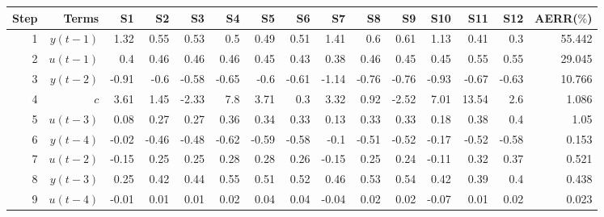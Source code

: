 \begin{tabular}{rrrrrrrrrrrrrrr}
Step & Terms & S1 & S2 & S3 & S4 & S5 & S6 & S7 & S8 & S9 & S10 & S11 & S12 & AERR($\%$) \\ 
\hline 
1 & $y(t-1)$ & 1.32 & 0.55 & 0.53 & 0.5 & 0.49 & 0.51 & 1.41 & 0.6 & 0.61 & 1.13 & 0.41 & 0.3 & 55.442 \\ 
2 & $u(t-1)$ & 0.4 & 0.46 & 0.46 & 0.46 & 0.45 & 0.43 & 0.38 & 0.46 & 0.45 & 0.45 & 0.55 & 0.55 & 29.045 \\ 
3 & $y(t-2)$ & -0.91 & -0.6 & -0.58 & -0.65 & -0.6 & -0.61 & -1.14 & -0.76 & -0.76 & -0.93 & -0.67 & -0.63 & 10.766 \\ 
4 & $c$ & 3.61 & 1.45 & -2.33 & 7.8 & 3.71 & 0.3 & 3.32 & 0.92 & -2.52 & 7.01 & 13.54 & 2.6 & 1.086 \\ 
5 & $u(t-3)$ & 0.08 & 0.27 & 0.27 & 0.36 & 0.34 & 0.33 & 0.13 & 0.33 & 0.33 & 0.18 & 0.38 & 0.4 & 1.05 \\ 
6 & $y(t-4)$ & -0.02 & -0.46 & -0.48 & -0.62 & -0.59 & -0.58 & -0.1 & -0.51 & -0.52 & -0.17 & -0.52 & -0.58 & 0.153 \\ 
7 & $u(t-2)$ & -0.15 & 0.25 & 0.25 & 0.28 & 0.28 & 0.26 & -0.15 & 0.25 & 0.24 & -0.11 & 0.32 & 0.37 & 0.521 \\ 
8 & $y(t-3)$ & 0.25 & 0.42 & 0.44 & 0.55 & 0.51 & 0.52 & 0.46 & 0.53 & 0.54 & 0.42 & 0.39 & 0.4 & 0.438 \\ 
9 & $u(t-4)$ & -0.01 & 0.01 & 0.01 & 0.02 & 0.04 & 0.04 & -0.04 & 0.02 & 0.02 & -0.07 & 0.01 & 0.02 & 0.023 \\ 
\hline 
\end{tabular}